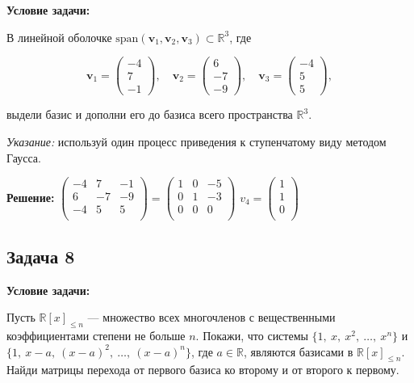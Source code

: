\documentclass[a4paper,12pt]{article}
\begin{document}
\textbf{Условие задачи:}

В линейной оболочке $\mathrm{span}(\mathbf{v}_1, \mathbf{v}_2, \mathbf{v}_3) \subset \mathbb{R}^3$, где

\[
\mathbf{v}_1 = \begin{pmatrix}-4 \\ 7 \\ -1\end{pmatrix},\quad
\mathbf{v}_2 = \begin{pmatrix}6 \\ -7 \\ -9\end{pmatrix},\quad
\mathbf{v}_3 = \begin{pmatrix}-4 \\ 5 \\ 5\end{pmatrix},
\]

выдели базис и дополни его до базиса всего пространства $\mathbb{R}^3$.

\textit{Указание:} используй один процесс приведения к ступенчатому виду методом Гаусса.


\textbf{Решение: }
$\begin{pmatrix}-4 & 7 & -1 \\
                6 & -7 & -9 \\
                -4 & 5 & 5 \\\end{pmatrix}
                =
\begin{pmatrix}1 & 0 & -5 \\
                0 & 1 & -3 \\
                0 & 0 & 0 \\\end{pmatrix}$
$v_4= \begin{pmatrix}
     1 \\ 1 \\ 0 \\
\end{pmatrix}    $
\vspace{0.5cm}

\subsection{Задача 8}

\textbf{Условие задачи:}

Пусть $\mathbb{R}[x]_{\leq n}$ — множество всех многочленов с вещественными коэффициентами степени не больше $n$. Покажи, что системы $\{1,\ x,\ x^2,\ \ldots,\ x^n\}$ и $\{1,\ x - a,\ (x - a)^2,\ \ldots,\ (x - a)^n\}$, где $a \in \mathbb{R}$, являются базисами в $\mathbb{R}[x]_{\leq n}$. Найди матрицы перехода от первого базиса ко второму и от второго к первому.
\end{document}
